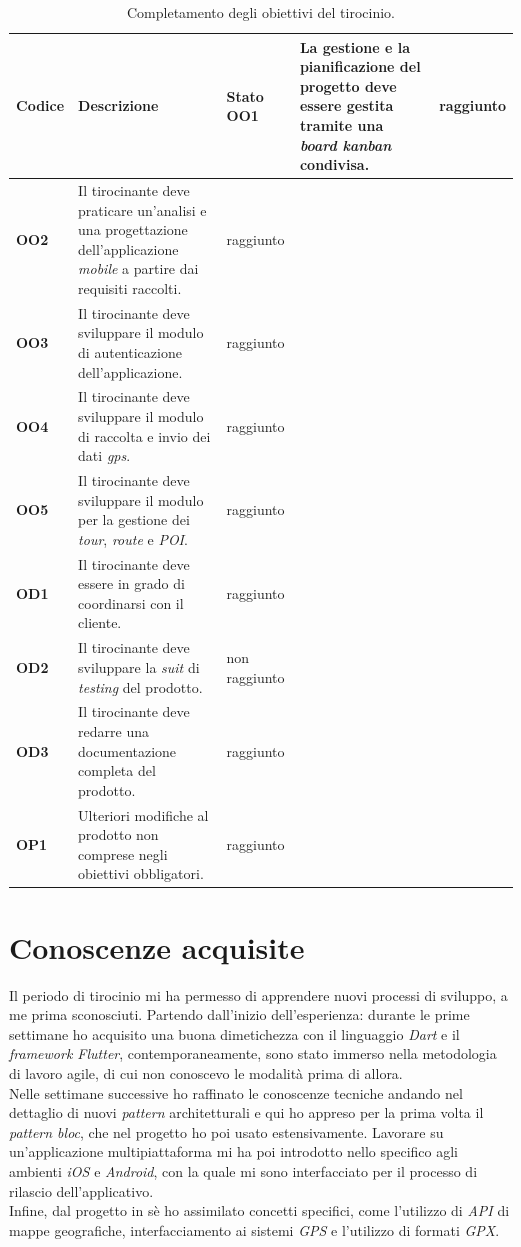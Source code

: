 \begin{longtable}{ |p{2cm}|p{6.5cm}|p{2.5cm}|  }
        \caption{Completamento degli obiettivi del tirocinio.}
        \label{tab:consu}
        \hline
        \textbf{Codice} & \textbf{Descrizione} & \textbf{Stato}
        \hline
        \textbf{OO1} & La gestione e la pianificazione del progetto deve essere gestita tramite una \textit{board kanban} condivisa. & raggiunto \\ \hline
        \textbf{OO2} & Il tirocinante deve praticare un'analisi e una progettazione dell'applicazione \textit{mobile} a partire dai requisiti raccolti.& raggiunto \\ \hline
        \textbf{OO3} & Il tirocinante deve sviluppare il modulo di autenticazione dell'applicazione.& raggiunto \\ \hline
        \textbf{OO4} & Il tirocinante deve sviluppare il modulo di raccolta e invio dei dati \textit{gps}. & raggiunto\\ \hline
        \textbf{OO5} & Il tirocinante deve sviluppare il modulo per la gestione dei \textit{tour}, \textit{route} e \textit{POI}.& raggiunto\\ \hline
        \textbf{OD1} & Il tirocinante deve essere in grado di coordinarsi con il cliente.& raggiunto \\ \hline
        \textbf{OD2} & Il tirocinante deve sviluppare la \textit{suit} di \textit{testing} del prodotto.& non raggiunto \\ \hline
        \textbf{OD3} & Il tirocinante deve redarre una documentazione completa del prodotto.& raggiunto \\ \hline
        \textbf{OP1} & Ulteriori modifiche al prodotto non comprese negli obiettivi obbligatori. & raggiunto\\ \hline
\end{longtable}

\section{Conoscenze acquisite}
Il periodo di tirocinio mi ha permesso di apprendere nuovi processi di sviluppo, a me prima sconosciuti. Partendo dall'inizio dell'esperienza: durante le prime settimane ho acquisito una buona dimetichezza con il linguaggio \textit{Dart} e il \textit{framework Flutter}, contemporaneamente, sono stato immerso nella metodologia di lavoro agile, di cui non conoscevo le modalità prima di allora.\\
Nelle settimane successive ho raffinato le conoscenze tecniche andando nel dettaglio di nuovi \textit{pattern} architetturali e qui ho appreso per la prima volta il \textit{pattern bloc}, che nel progetto ho poi usato estensivamente. Lavorare su un'applicazione multipiattaforma mi ha poi introdotto nello specifico agli ambienti \textit{iOS} e \textit{Android}, con la quale mi sono interfacciato per il processo di rilascio dell'applicativo.\\
Infine, dal progetto in sè ho assimilato concetti specifici, come l'utilizzo di \textit{API} di mappe geografiche, interfacciamento ai sistemi \textit{GPS} e l'utilizzo di formati \textit{GPX}.

